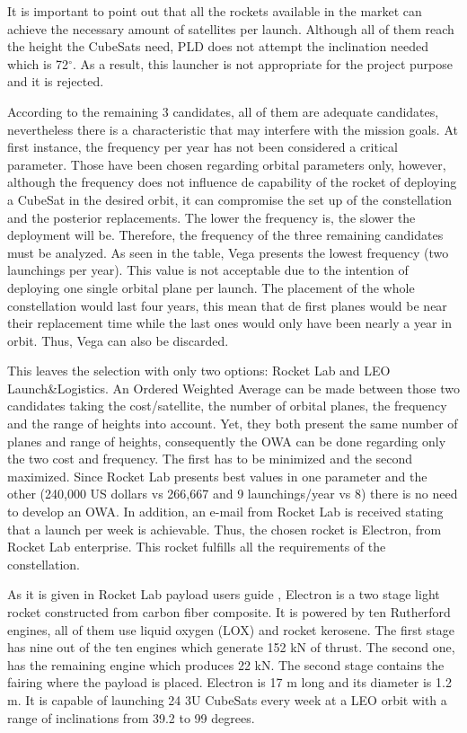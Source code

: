 It is important to point out that all the rockets available in the market can achieve the necessary amount of satellites per launch. Although all of them reach the height the CubeSats need, PLD does not attempt the inclination needed which is 72$^{\circ}$. As a result, this launcher is not appropriate for the project purpose and it is rejected. 

According to the remaining 3 candidates, all of them are adequate candidates, nevertheless there is a characteristic that may interfere with the mission goals. At first instance, the frequency per year has not been considered a critical parameter. Those have been chosen regarding orbital parameters only, however, although the frequency does not influence de capability of the rocket of deploying a CubeSat in the desired orbit, it can compromise the set up of the constellation and the posterior replacements. The lower the frequency is, the slower the deployment will be. Therefore, the frequency of the three remaining candidates must be analyzed. As seen in the table, Vega presents the lowest frequency (two launchings per year). This value is not acceptable due to the intention of deploying one single orbital plane per launch. The placement of the whole constellation would last four years, this mean that de first planes would be near their replacement time while the last ones would only have been nearly a year in orbit. Thus, Vega can also be discarded.
 
This leaves the selection with only two options: Rocket Lab and LEO Launch\&Logistics. An Ordered Weighted Average can be made between those two candidates taking the cost/satellite, the number of orbital planes, the frequency and the range of heights into account. Yet, they both present the same number of planes and range of heights, consequently the OWA can be done regarding only the two cost and frequency. The first has to be minimized and the second maximized. Since Rocket Lab presents best values in one parameter and the other (240,000 US dollars vs 266,667 and 9 launchings/year vs 8) there is no need to develop an OWA. In addition, an e-mail from Rocket Lab is received stating that a launch per week is achievable. Thus, the chosen rocket is Electron, from Rocket Lab enterprise. This rocket fulfills all the requirements of the constellation. 

As it is given in Rocket Lab payload users guide \cite{Guide2016}, Electron is a two stage light rocket constructed from carbon fiber composite. It is powered by ten Rutherford engines, all of them use liquid oxygen (LOX) and rocket kerosene. The first stage has nine out of the ten engines which generate 152 kN of thrust. The second one, has the remaining engine which produces 22 kN. The second stage contains the fairing where the payload is placed. Electron is 17 m long and its diameter is 1.2 m. It is capable of launching 24 3U CubeSats every week at a LEO orbit with a range of inclinations from 39.2 to 99 degrees. 


